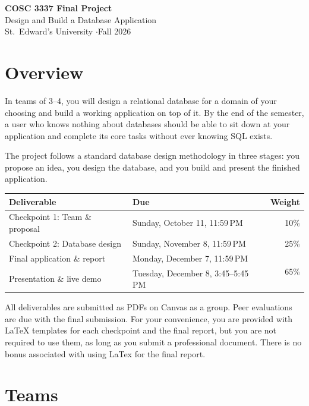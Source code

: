 \documentclass[11pt]{article}
\newcommand{\cponedue}{Sunday, October 11, 11:59\,PM}
\newcommand{\cptwodue}{Sunday, November 8, 11:59\,PM}
\newcommand{\presdatesshort}{Tuesday, December 8, 3:45--5:45\,PM}
\newcommand{\finaldue}{Monday, December 7, 11:59\,PM}
\begin{document}
\begin{center}
  {\LARGE\bfseries COSC 3337 Final Project}\\[4pt]
  {\large Design and Build a Database Application}\\[4pt]
  St.\ Edward's University \quad$\cdot$\quad Fall 2026
\end{center}

\section*{Overview}

In teams of 3--4, you will design a relational database for a domain of your choosing and build a working application on top of it. By the end of the semester, a user who knows nothing about databases should be able to sit down at your application and complete its core tasks without ever knowing SQL exists.

The project follows a standard database design methodology in three stages: you propose an idea, you design the database, and you build and present the finished application.

\begin{center}
\begin{tabularx}{0.92\textwidth}{@{}lXr@{}}
\toprule
\textbf{Deliverable} & \textbf{Due} & \textbf{Weight} \\
\midrule
Checkpoint 1: Team \& proposal & \cponedue & 10\% \\
Checkpoint 2: Database design & \cptwodue & 25\% \\
Final application \& report & \finaldue & \multirow{2}{*}{65\%} \\
Presentation \& live demo & \presdatesshort & \\
\bottomrule
\end{tabularx}
\end{center}

\noindent All deliverables are submitted as PDFs on Canvas as a group. Peer evaluations are due with the final submission. 
For your convenience, you are provided with LaTeX templates for each checkpoint and the final report, but you are not required to use them, as long as you submit a professional document.
There is no bonus associated with using LaTex for the final report.

\section{Teams}
\end{document}
